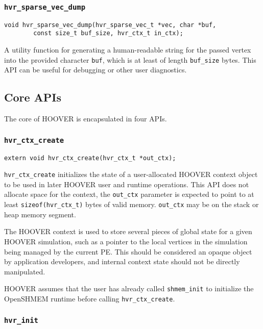 \subsubsection{\texttt{hvr\_sparse\_vec\_dump}}

\begin{verbatim}
void hvr_sparse_vec_dump(hvr_sparse_vec_t *vec, char *buf,
        const size_t buf_size, hvr_ctx_t in_ctx);
\end{verbatim}

A utility function for generating a human-readable string for the passed vertex
into the provided character \texttt{buf}, which is at least of length
\texttt{buf\_size} bytes. This API can be useful for debugging or other user
diagnostics.

\subsection{Core APIs}

The core of HOOVER is encapsulated in four APIs.

\subsubsection{\texttt{hvr\_ctx\_create}}

\begin{verbatim}
extern void hvr_ctx_create(hvr_ctx_t *out_ctx);
\end{verbatim}

\texttt{hvr\_ctx\_create} initializes the state of a user-allocated HOOVER
context object to be used in later HOOVER user and runtime operations. This API
does not allocate space for the context, the \texttt{out\_ctx} parameter is
expected to point to at least \texttt{sizeof(hvr\_ctx\_t)} bytes of valid
memory. \texttt{out\_ctx} may be on the stack or heap memory segment.

The HOOVER context is used to store several pieces of global state for a given HOOVER
simulation, such as a pointer to the local vertices in the simulation being
managed by the current PE. This should be considered an opaque object by
application developers, and internal context state should not be directly
manipulated.

HOOVER assumes that the user has already called \texttt{shmem\_init} to
initialize the OpenSHMEM runtime before calling \texttt{hvr\_ctx\_create}.

\subsubsection{\texttt{hvr\_init}}

